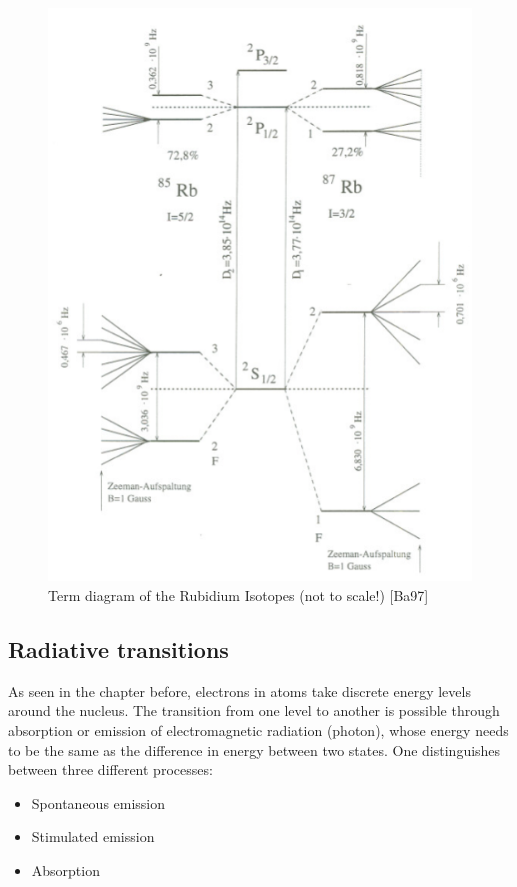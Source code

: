 \begin{figure}[H]
\centering \includegraphics[width = \textwidth]{BilderTheo/RbEnergielevel.png}
\caption{Term diagram of the Rubidium Isotopes (not to scale!) [Ba97]} 
\label{termschema}
\end{figure}

\subsection{Radiative transitions}

As seen in the chapter before, electrons in atoms take discrete energy levels around the nucleus. The transition from one level to another is possible through absorption or emission of electromagnetic radiation (photon), whose energy needs to be the same as the difference in energy between two states. One distinguishes between three different processes:

\begin{itemize}
\item Spontaneous emission
\item Stimulated emission
\item Absorption
\end{itemize}

